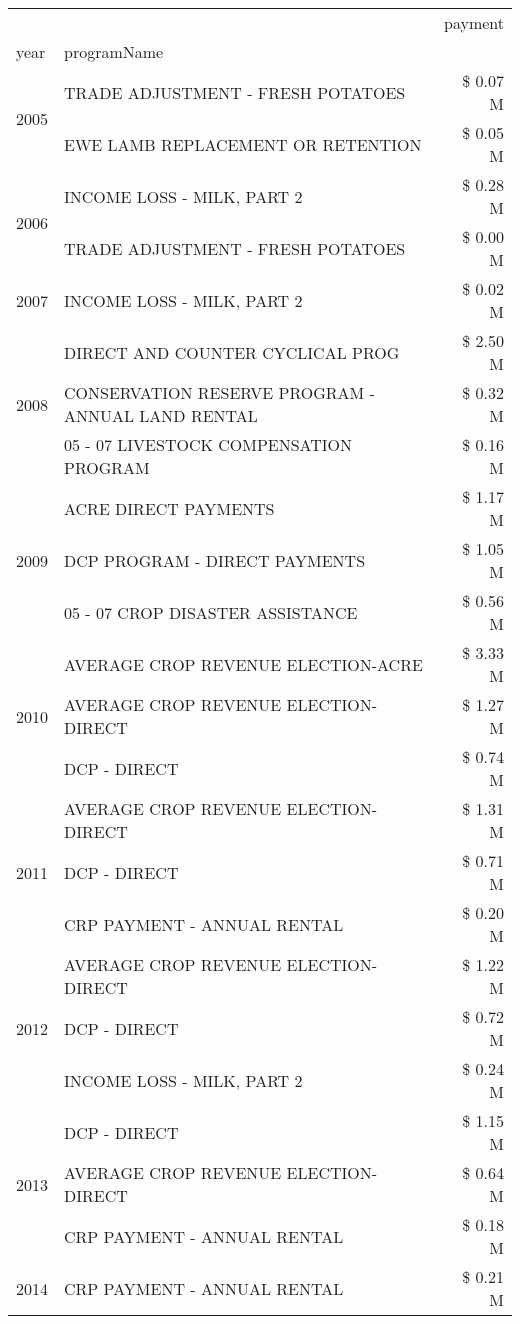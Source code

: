 \begin{tabular}{llr}
\toprule
 &  & payment \\
year & programName &  \\
\midrule
\multirow[t]{2}{*}{2005} & TRADE ADJUSTMENT - FRESH POTATOES & \$ 0.07 M \\
 & EWE LAMB REPLACEMENT OR RETENTION & \$ 0.05 M \\
\cline{1-3}
\multirow[t]{2}{*}{2006} & INCOME LOSS - MILK, PART 2 & \$ 0.28 M \\
 & TRADE ADJUSTMENT - FRESH POTATOES & \$ 0.00 M \\
\cline{1-3}
2007 & INCOME LOSS - MILK, PART 2 & \$ 0.02 M \\
\cline{1-3}
\multirow[t]{3}{*}{2008} & DIRECT AND COUNTER CYCLICAL PROG & \$ 2.50 M \\
 & CONSERVATION RESERVE PROGRAM - ANNUAL LAND RENTAL & \$ 0.32 M \\
 & 05 - 07 LIVESTOCK COMPENSATION PROGRAM & \$ 0.16 M \\
\cline{1-3}
\multirow[t]{3}{*}{2009} & ACRE DIRECT PAYMENTS & \$ 1.17 M \\
 & DCP PROGRAM - DIRECT PAYMENTS & \$ 1.05 M \\
 & 05 - 07 CROP DISASTER ASSISTANCE & \$ 0.56 M \\
\cline{1-3}
\multirow[t]{3}{*}{2010} & AVERAGE CROP REVENUE ELECTION-ACRE & \$ 3.33 M \\
 & AVERAGE CROP REVENUE ELECTION-DIRECT & \$ 1.27 M \\
 & DCP - DIRECT & \$ 0.74 M \\
\cline{1-3}
\multirow[t]{3}{*}{2011} & AVERAGE CROP REVENUE ELECTION-DIRECT & \$ 1.31 M \\
 & DCP - DIRECT & \$ 0.71 M \\
 & CRP PAYMENT - ANNUAL RENTAL & \$ 0.20 M \\
\cline{1-3}
\multirow[t]{3}{*}{2012} & AVERAGE CROP REVENUE ELECTION-DIRECT & \$ 1.22 M \\
 & DCP - DIRECT & \$ 0.72 M \\
 & INCOME LOSS - MILK, PART 2 & \$ 0.24 M \\
\cline{1-3}
\multirow[t]{3}{*}{2013} & DCP - DIRECT & \$ 1.15 M \\
 & AVERAGE CROP REVENUE ELECTION-DIRECT & \$ 0.64 M \\
 & CRP PAYMENT - ANNUAL RENTAL & \$ 0.18 M \\
\cline{1-3}
\multirow[t]{3}{*}{2014} & CRP PAYMENT - ANNUAL RENTAL & \$ 0.21 M \\

\end{tabular}
